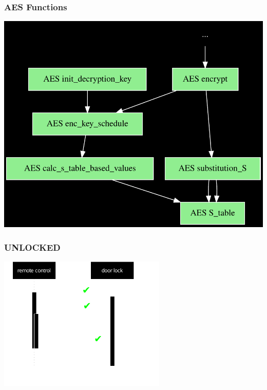 \documentclass[aspectratio=169]{beamer}
\begin{document}
\begin{frame}
	\frametitle{AES Functions}

	\begin{center}
		\includegraphics[height=0.9\textheight]{small-graph-named.pdf}
	\end{center}
\end{frame}

\begin{frame}
	\frametitle{UNLOCKED}

	\begin{center}
		\includegraphics[width=0.6\textwidth]{communication3.pdf}
	\end{center}
\end{frame}
\end{document}
